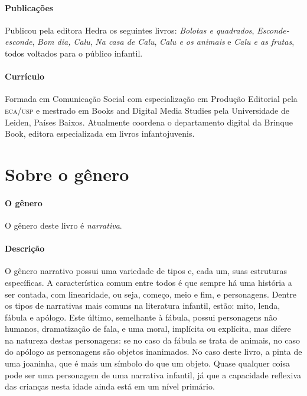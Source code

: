 \documentclass[11pt]{extarticle}
\begin{document}
\paragraph{Publicações}
Publicou pela editora Hedra os seguintes livros: \emph{Bolotas e quadrados},
\emph{Esconde-esconde}, \emph{Bom dia, Calu}, \emph{Na casa de Calu}, \emph{Calu e os animais} e
\emph{Calu e as frutas}, todos voltados para o público infantil.


\paragraph{Currículo} 
Formada em Comunicação Social com 
especialização em Produção Editorial pela \textsc{eca/usp} 
e mestrado em Books and Digital Media Studies pela 
Universidade de Leiden, Países Baixos.
Atualmente coordena o departamento digital da Brinque 
Book, editora especializada em livros infantojuvenis.




\section{Sobre o gênero}

\paragraph{O gênero} O gênero deste livro é \textit{narrativa}. 

\paragraph{Descrição} 
O gênero narrativo possui uma variedade de tipos e, cada um, suas estruturas específicas.
A característica comum entre todos é que sempre há uma história a ser contada, com linearidade,
ou seja, começo, meio e fim, e personagens. 
Dentre os tipos de narrativas mais comuns na literatura infantil, estão: mito, lenda, 
fábula e apólogo. Este último, semelhante à fábula, possui personagens não humanos, 
dramatização de fala, e uma moral, implícita ou explícita, mas difere na natureza destas 
personagens: se no caso da fábula se trata de animais, no caso do apólogo as personagens 
são objetos inanimados. No caso deste livro, a pinta de uma joaninha, que é mais um 
símbolo do que um objeto. Quase qualquer coisa pode ser uma personagem de uma narrativa 
infantil, já que a capacidade reflexiva das crianças nesta idade ainda está em um nível primário. 
\end{document}
